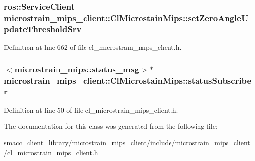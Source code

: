 \subsubsection[{\texorpdfstring{set\+Zero\+Angle\+Update\+Threshold\+Srv}{setZeroAngleUpdateThresholdSrv}}]{\setlength{\rightskip}{0pt plus 5cm}ros\+::\+Service\+Client microstrain\+\_\+mips\+\_\+client\+::\+Cl\+Microstain\+Mips\+::set\+Zero\+Angle\+Update\+Threshold\+Srv\hspace{0.3cm}{\ttfamily [protected]}}\hypertarget{classmicrostrain__mips__client_1_1ClMicrostainMips_aa512e932514eba1022ac4453942dfb68}{}\label{classmicrostrain__mips__client_1_1ClMicrostainMips_aa512e932514eba1022ac4453942dfb68}


Definition at line 662 of file cl\+\_\+microstrain\+\_\+mips\+\_\+client.\+h.

\subsubsection[{\texorpdfstring{status\+Subscriber}{statusSubscriber}}]{$<$microstrain\+\_\+mips\+::status\+\_\+msg$>$$\ast$ microstrain\+\_\+mips\+\_\+client\+::\+Cl\+Microstain\+Mips\+::status\+Subscriber}\hypertarget{classmicrostrain__mips__client_1_1ClMicrostainMips_ac35f8c095ccda178eb68bb94c705c024}{}\label{classmicrostrain__mips__client_1_1ClMicrostainMips_ac35f8c095ccda178eb68bb94c705c024}


Definition at line 50 of file cl\+\_\+microstrain\+\_\+mips\+\_\+client.\+h.



The documentation for this class was generated from the following file\+:\begin{DoxyCompactItemize}
\item 
smacc\+\_\+client\+\_\+library/microstrain\+\_\+mips\+\_\+client/include/microstrain\+\_\+mips\+\_\+client/\hyperlink{cl__microstrain__mips__client_8h}{cl\+\_\+microstrain\+\_\+mips\+\_\+client.\+h}\end{DoxyCompactItemize}
